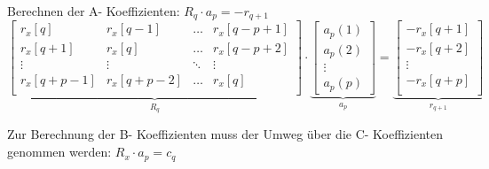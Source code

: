 \begin{aufzaehlung}
  		\item Berechnen der A- Koeffizienten: $R_q \cdot a_p = - r_{q+1}$
  		\small$$
\underbrace{\begin{bmatrix}                   
    		r_x[q] & r_x[q-1] & \hdots & r_x[q-p+1] \\   
    		r_x[q+1] & r_x[q] & \hdots & r_x[q-p+2] \\    
    		\vdots & \vdots & \ddots & \vdots \\     
    		r_x[q+p-1] & r_x[q+p-2] & \hdots & r_x[q] \\ 
		\end{bmatrix}  }_{R_q} \cdot \underbrace{\begin{bmatrix}
    		a_p(1) \\
    		a_p(2) \\
    		\vdots \\
    		a_p(p)
		\end{bmatrix}  }_{a_p}= \underbrace{\begin{bmatrix}
    		 -r_x[q+1]\\            
    		 -r_x[q+2]\\
    		\vdots \\
    		 -r_x[q+p]\\
		\end{bmatrix}}_{r_{q+1}} 
		 $$ \normalsize
		 \item Zur Berechnung der B- Koeffizienten muss der Umweg über die C- Koeffizienten genommen werden: $R_x \cdot a_p = c_q$
	

\end{aufzaehlung}
